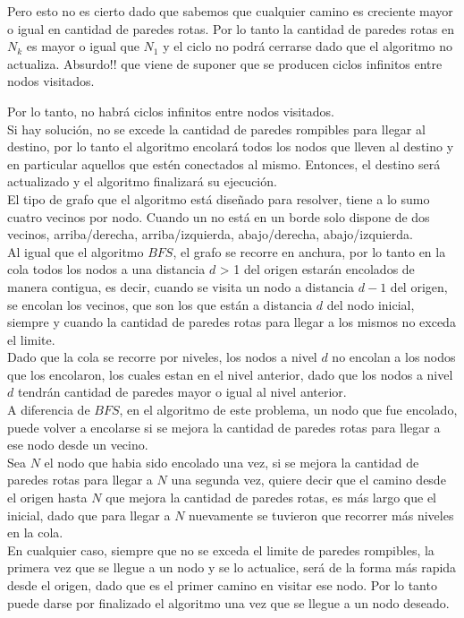 Pero esto no es cierto dado que sabemos que cualquier camino es creciente mayor o igual en cantidad de paredes rotas. 
Por lo tanto la cantidad de paredes rotas en $N_k$ es mayor o igual que $N_1$ y el ciclo no podrá cerrarse dado que el algoritmo no actualiza. Absurdo!! que viene de suponer que se producen ciclos infinitos entre nodos visitados.

Por lo tanto, no habrá ciclos infinitos entre nodos visitados.\\

Si hay solución, no se excede la cantidad de paredes rompibles para llegar al destino, por lo tanto el algoritmo encolará todos los nodos que lleven al destino y en particular aquellos que estén conectados al mismo. Entonces, el destino será actualizado y el algoritmo finalizará su ejecución.\\

El tipo de grafo que el algoritmo está diseñado para resolver, tiene a lo sumo cuatro vecinos por nodo. Cuando un no está en un borde solo dispone de dos vecinos, arriba/derecha, arriba/izquierda, abajo/derecha, abajo/izquierda.\\

Al igual que el algoritmo $BFS$, el grafo se recorre en anchura, por lo tanto en la cola todos los nodos a una distancia $d$ > 1 del origen estarán encolados de manera contigua, es decir, cuando se visita un nodo a distancia $d-1$ del origen, se encolan los vecinos, que son los que están a distancia $d$ del nodo inicial, siempre y cuando la cantidad de paredes rotas para llegar a los mismos no exceda el limite.\\

Dado que la cola se recorre por niveles, los nodos a nivel $d$ no encolan a los nodos que los encolaron, los cuales estan en el nivel anterior, dado que los nodos a nivel $d$ tendrán cantidad de paredes mayor o igual al nivel anterior.\\

A diferencia de $BFS$, en el algoritmo de este problema, un nodo que fue encolado, puede volver a encolarse si se mejora la cantidad de paredes rotas para llegar a ese nodo desde un vecino.\\

Sea $N$ el nodo que habia sido encolado una vez, si se mejora la cantidad de paredes rotas para llegar a $N$ una segunda vez, quiere decir que el camino desde el origen hasta $N$ que mejora la cantidad de paredes rotas, es más largo que el inicial, dado que para llegar a $N$ nuevamente se tuvieron que recorrer más niveles en la cola.\\
En cualquier caso, siempre que no se exceda el limite de paredes rompibles, la primera vez que se llegue a un nodo y se lo actualice, será de la forma más rapida desde el origen, dado que es el primer camino en visitar ese nodo. Por lo tanto puede darse por finalizado el algoritmo una vez que se llegue a un nodo deseado.\\

